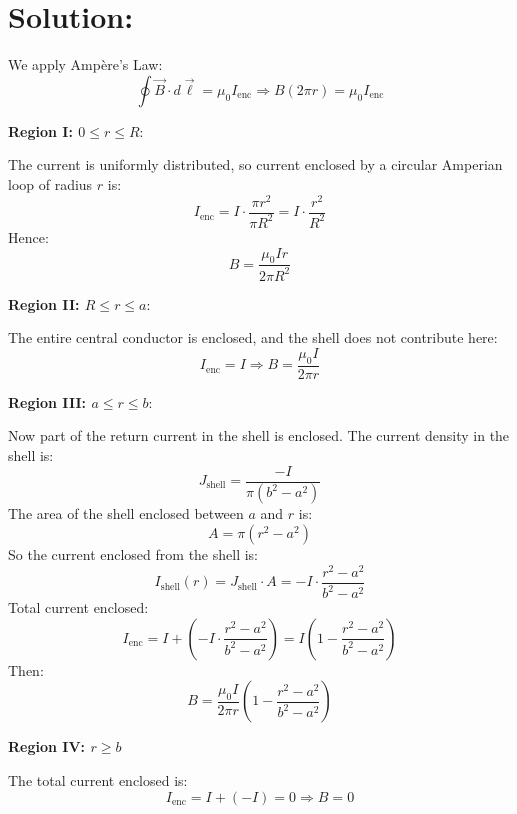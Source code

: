 \section*{Solution:}
\begin{solution}
    We apply Ampère's Law:
    \[
    \oint \vec{B} \cdot d\vec{\ell} = \mu_0 I_{\text{enc}} \Rightarrow B(2\pi r) = \mu_0 I_{\text{enc}}
    \]


\noindent
\textbf{Region I: $0 \leq r \leq R$}:

\noindent
The current is uniformly distributed, so current enclosed by a circular Amperian loop of radius $r$ is:
    \[
    I_{\text{enc}} = I \cdot \frac{\pi r^2}{\pi R^2} = I \cdot \frac{r^2}{R^2}
    \]
    Hence:
    \[
    B = \frac{\mu_0 I r}{2\pi R^2}
    \]

\noindent
\textbf{Region II: $R \leq r \leq a$}:

\noindent
    The entire central conductor is enclosed, and the shell does not contribute here:
    \[
    I_{\text{enc}} = I \Rightarrow B = \frac{\mu_0 I}{2\pi r}
    \]

    \noindent
    \textbf{Region III: $a \leq r \leq b$}:

    \noindent
    Now part of the return current in the shell is enclosed. The current density in the shell is:
    \[
    J_{\text{shell}} = \frac{-I}{\pi(b^2 - a^2)}
    \]
    The area of the shell enclosed between $a$ and $r$ is:
    \[
    A = \pi (r^2 - a^2)
    \]
    So the current enclosed from the shell is:
    \[
    I_{\text{shell}}(r) = J_{\text{shell}} \cdot A = -I \cdot \frac{r^2 - a^2}{b^2 - a^2}
    \]
    Total current enclosed:
    \[
    I_{\text{enc}} = I + \left(-I \cdot \frac{r^2 - a^2}{b^2 - a^2} \right)
    = I \left(1 - \frac{r^2 - a^2}{b^2 - a^2} \right)
    \]
    Then:
    \[
    B = \frac{\mu_0 I}{2\pi r} \left(1 - \frac{r^2 - a^2}{b^2 - a^2} \right)
    \]

    \medskip
    \textbf{Region IV: $r \geq b$}

    The total current enclosed is:
    \[
    I_{\text{enc}} = I + (-I) = 0 \Rightarrow B = 0
    \]



\end{solution}